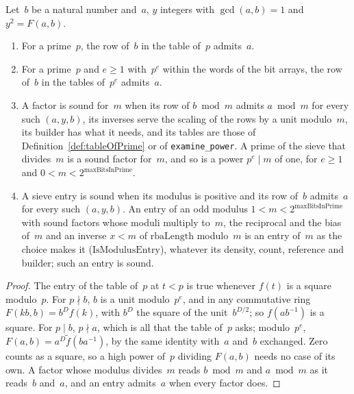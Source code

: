 \begin{lemma}\label{lem:sieveEntry_sound}
  \leanok
  Let~$b$ be a natural number and~$a$, $y$ integers with $\gcd(a, b) = 1$ and $y^2 = F(a, b)$.
  \begin{enumerate}
    \item For a prime~$p$, the row of~$b$ in the table of~$p$ admits~$a$.
    \item For a prime~$p$ and $e \ge 1$ with~$p^e$ within the words of the bit arrays, the row
      of~$b$ in the tables of~$p^e$ admits~$a$.
    \item A factor is sound for~$m$ when its row of $b \bmod m$ admits $a \bmod m$ for every such
      $(a, y, b)$, its inverses serve the scaling of the rows by a unit modulo~$m$, its builder has
      what it needs, and its tables are those of Definition~\ref{def:tableOfPrime} or of
      \verb|examine_power|. A prime of the sieve that divides~$m$ is a sound factor for~$m$, and so
      is a power $p^e \mid m$ of one, for $e \ge 1$ and $0 < m < 2^{\mathrm{maxBitsInPrime}}$.
    \item A sieve entry is sound when its modulus is positive and its row of~$b$ admits~$a$ for
      every such $(a, y, b)$. An entry of an odd modulus $1 < m < 2^{\mathrm{maxBitsInPrime}}$
      with sound factors whose moduli multiply to~$m$, the reciprocal and the bias of~$m$ and an
      inverse $x < m$ of $\mathrm{rbaLength}$ modulo~$m$ is an entry of~$m$ as the choice makes it
      ($\mathrm{IsModulusEntry}$), whatever its density, count, reference and builder; such an
      entry is sound.
  \end{enumerate}
\end{lemma}

\begin{proof}
  \leanok
  The entry of the table of~$p$ at $t < p$ is true whenever $f(t)$ is a square modulo~$p$. For
  $p \nmid b$, $b$ is a unit modulo~$p^e$, and in any commutative ring $F(k b, b) = b^D f(k)$, with
  $b^D$ the square of the unit~$b^{D/2}$; so $f(a b^{-1})$ is a square. For $p \mid b$,
  $p \nmid a$, which is all that the table of~$p$ asks; modulo~$p^e$,
  $F(a, b) = a^D \tilde f(b a^{-1})$, by the same identity with~$a$ and~$b$ exchanged. Zero counts
  as a square, so a high power of~$p$ dividing $F(a, b)$ needs no case of its own. A factor whose
  modulus divides~$m$ reads $b \bmod m$ and $a \bmod m$ as it reads~$b$ and~$a$, and an entry
  admits~$a$ when every factor does.
\end{proof}

